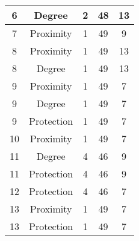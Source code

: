 \documentclass[results.tex]{subfiles}
\begin{document}
\begin{center}
\begin{tabular}{| c || c | c | c | c |}
            \hline
            6                       & Degree                       & 2                      & 48                      & 13                   \\
            \hline
            7                       & Proximity                    & 1                      & 49                      & 9                    \\
            \hline
            8                       & Proximity                    & 1                      & 49                      & 13                   \\
            \hline
            8                       & Degree                       & 1                      & 49                      & 13                   \\
            \hline
            9                       & Proximity                    & 1                      & 49                      & 7                    \\
            \hline
            9                       & Degree                       & 1                      & 49                      & 7                    \\
            \hline
            9                       & Protection                   & 1                      & 49                      & 7                    \\
            \hline
            10                      & Proximity                    & 1                      & 49                      & 7                    \\
            \hline
            11                      & Degree                       & 4                      & 46                      & 9                    \\
            \hline
            11                      & Protection                   & 4                      & 46                      & 9                    \\
            \hline
            12                      & Protection                   & 4                      & 46                      & 7                    \\
            \hline
            13                      & Proximity                    & 1                      & 49                      & 7                    \\
            \hline
            13                      & Protection                   & 1                      & 49                      & 7                    \\

\end{tabular}
\end{center}
\end{document}
